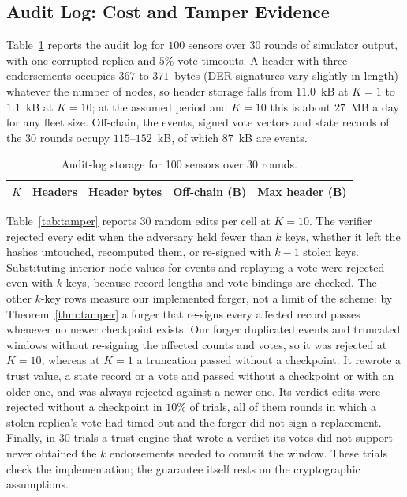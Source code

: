\subsection{Audit Log: Cost and Tamper Evidence}
\label{sec:res-ext3}
Table~\ref{tab:chain} reports the audit log for $100$ sensors over
$30$ rounds of simulator output, with one corrupted replica and $5\%$
vote timeouts.  A header with three endorsements occupies $367$ to
$371$~bytes (DER signatures vary slightly in length) whatever the
number of nodes, so header storage falls from $11.0$~kB at $K=1$ to
$1.1$~kB at $K=10$; at the assumed period and $K=10$ this is about
$27$~MB a day for any fleet size.  Off-chain, the events, signed vote
vectors and state records of the 30 rounds occupy $115$--$152$~kB, of
which $87$~kB are events.

\begin{table}[!t]
\caption{Audit-log storage for 100 sensors over 30 rounds.}
\label{tab:chain}
\centering
\renewcommand{\arraystretch}{1.08}
\footnotesize
\setlength{\tabcolsep}{4pt}
\begin{tabular}{rrrrr}
\toprule
$K$ & \textbf{Headers} & \textbf{Header bytes} & \textbf{Off-chain (B)} & \textbf{Max header (B)} \\
\midrule
\bottomrule
\end{tabular}
\end{table}

Table~\ref{tab:tamper} reports $30$ random edits per cell at $K=10$.
The verifier rejected every edit when the adversary held fewer than
$k$ keys, whether it left the hashes untouched, recomputed them, or
re-signed with $k-1$ stolen keys.  Substituting interior-node values
for events and replaying a vote were rejected even with $k$ keys,
because record lengths and vote bindings are checked.  The other
$k$-key rows measure our implemented forger, not a limit of the
scheme: by Theorem~\ref{thm:tamper} a forger that re-signs every
affected record passes whenever no newer checkpoint exists.  Our
forger duplicated events and truncated windows without re-signing the
affected counts and votes, so it was rejected at $K=10$, whereas at
$K=1$ a truncation passed without a checkpoint.  It rewrote a trust
value, a state record or a vote and passed without a checkpoint or
with an older one, and was always rejected against a newer one.  Its
verdict edits were rejected without a checkpoint in $10\%$ of trials,
all of them rounds in which a stolen replica's vote had timed out and
the forger did not sign a replacement.  Finally, in $30$ trials a trust engine
that wrote a verdict its votes did not support never obtained the $k$
endorsements needed to commit the window.  These trials check the
implementation; the guarantee itself rests on the cryptographic
assumptions.

